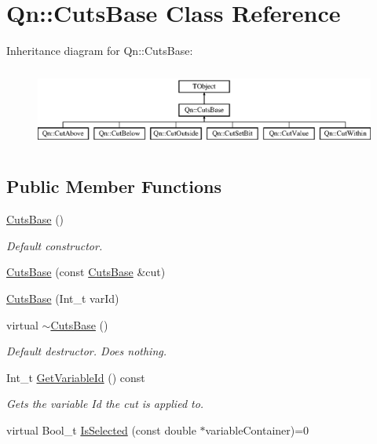 \hypertarget{classQn_1_1CutsBase}{}\section{Qn\+:\+:Cuts\+Base Class Reference}
\label{classQn_1_1CutsBase}
Inheritance diagram for Qn\+:\+:Cuts\+Base\+:\begin{figure}[H]
\begin{center}
\leavevmode
\includegraphics[height=2.666667cm]{classQn_1_1CutsBase}
\end{center}
\end{figure}
\subsection*{Public Member Functions}
\begin{DoxyCompactItemize}
\item 
\mbox{\label{classQn_1_1CutsBase_ae3c7d2ed894bf844ccf9431797e2e3ad}} 
\mbox{\hyperlink{classQn_1_1CutsBase_ae3c7d2ed894bf844ccf9431797e2e3ad}{Cuts\+Base}} ()
\begin{DoxyCompactList}\small\item\em Default constructor. \end{DoxyCompactList}\item 
\mbox{\hyperlink{classQn_1_1CutsBase_a5b86fd2a224c93e313c545e926d30539}{Cuts\+Base}} (const \mbox{\hyperlink{classQn_1_1CutsBase}{Cuts\+Base}} \&cut)
\item 
\mbox{\hyperlink{classQn_1_1CutsBase_a0b506ca7d770a8d5991b7f22848e7b81}{Cuts\+Base}} (Int\+\_\+t var\+Id)
\item 
\mbox{\label{classQn_1_1CutsBase_ad000d14b6b95500bee244aedb0086813}} 
virtual \mbox{\hyperlink{classQn_1_1CutsBase_ad000d14b6b95500bee244aedb0086813}{$\sim$\+Cuts\+Base}} ()
\begin{DoxyCompactList}\small\item\em Default destructor. Does nothing. \end{DoxyCompactList}\item 
\mbox{\label{classQn_1_1CutsBase_a9fcdc1df927edefd1c6fe772d4a70ea2}} 
Int\+\_\+t \mbox{\hyperlink{classQn_1_1CutsBase_a9fcdc1df927edefd1c6fe772d4a70ea2}{Get\+Variable\+Id}} () const
\begin{DoxyCompactList}\small\item\em Gets the variable Id the cut is applied to. \end{DoxyCompactList}\item 
virtual Bool\+\_\+t \mbox{\hyperlink{classQn_1_1CutsBase_aab081fa4220144505ca838539d83aa8d}{Is\+Selected}} (const double $\ast$variable\+Container)=0
\end{DoxyCompactItemize}
